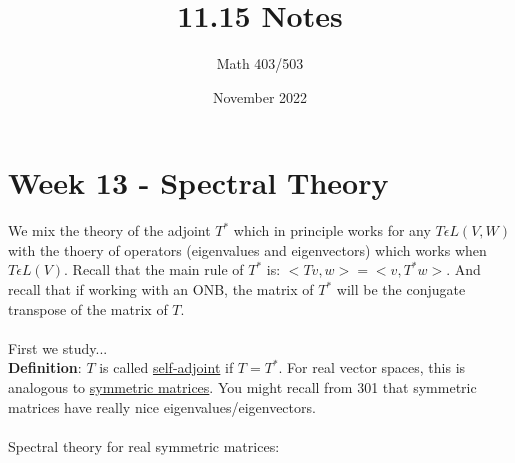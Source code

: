 \documentclass{article}
\title{11.15 Notes}
\author{Math 403/503}
\date{November 2022}
\begin{document}
\maketitle

\section{Week 13 - Spectral Theory}
We mix the theory of the adjoint $T^*$ which in principle works for any $T \epsilon L(V,W)$ with the thoery of operators (eigenvalues and eigenvectors) which works when $T \epsilon L(V)$. Recall that the main rule of $T^*$ is: $<Tv,w> = <v, T^*w>$. And recall that if working with an ONB, the matrix of $T^*$ will be the conjugate transpose of the matrix of $T$. \\\\
First we study...\\
\textbf{Definition}: $T$ is called \underline{self-adjoint} if $T = T^*$. For real vector spaces, this is analogous to \underline{symmetric matrices}. You might recall from 301 that symmetric matrices have really nice eigenvalues/eigenvectors. \\\\
Spectral theory for real symmetric matrices: 
\end{document}
